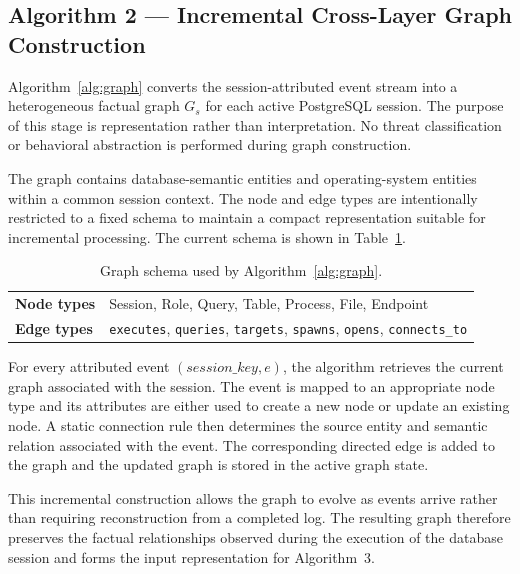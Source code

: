 \documentclass[conference]{IEEEtran}
\begin{document}
\subsection{Algorithm 2 --- Incremental Cross-Layer Graph Construction}
\label{subsec:graph}

Algorithm~\ref{alg:graph} converts the session-attributed event stream into a heterogeneous factual graph $G_s$ for each active PostgreSQL session. The purpose of this stage is representation rather than interpretation. No threat classification or behavioral abstraction is performed during graph construction.

The graph contains database-semantic entities and operating-system entities within a common session context. The node and edge types are intentionally restricted to a fixed schema to maintain a compact representation suitable for incremental processing. The current schema is shown in Table~\ref{tab:schema}.

\begin{table}[t]
\centering
\caption{Graph schema used by Algorithm~\ref{alg:graph}.}
\label{tab:schema}
\small
\begin{tabular}{@{}ll@{}}
\toprule
\textbf{Node types} & Session, Role, Query, Table, Process, File, Endpoint \\
\textbf{Edge types} &
\texttt{executes}, \texttt{queries}, \texttt{targets}, 
\texttt{spawns}, \texttt{opens}, \texttt{connects\_to} \\
\bottomrule
\end{tabular}
\end{table}


For every attributed event $(session\_key,e)$, the algorithm retrieves the current graph associated with the session. The event is mapped to an appropriate node type and its attributes are either used to create a new node or update an existing node. A static connection rule then determines the source entity and semantic relation associated with the event. The corresponding directed edge is added to the graph and the updated graph is stored in the active graph state.

This incremental construction allows the graph to evolve as events arrive rather than requiring reconstruction from a completed log. The resulting graph therefore preserves the factual relationships observed during the execution of the database session and forms the input representation for Algorithm~3.
\end{document}
